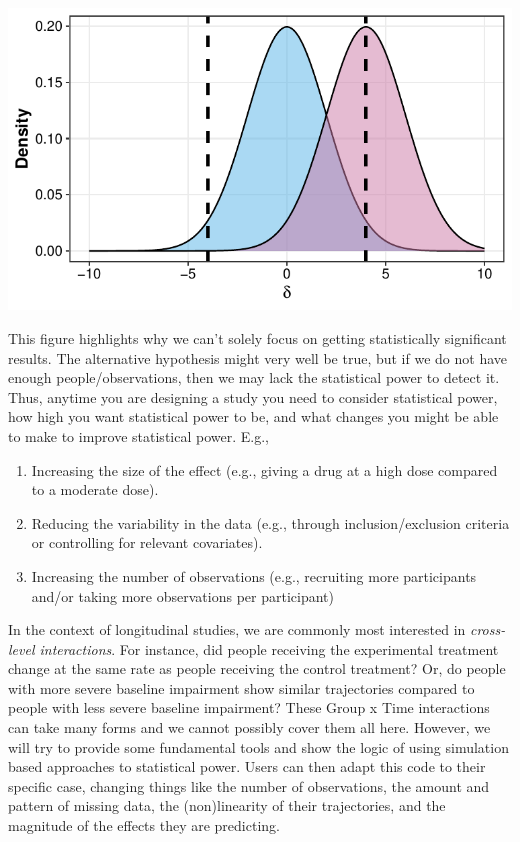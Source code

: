 \documentclass[
]{article}
\providecommand{\tightlist}{%
  \setlength{\itemsep}{0pt}\setlength{\parskip}{0pt}}
\begin{document}
\begin{center}\includegraphics{lohse_ACRM_2023_module_04_files/figure-latex/figure 1-1} \end{center}

This figure highlights why we can't solely focus on getting
statistically significant results. The alternative hypothesis might very
well be true, but if we do not have enough people/observations, then we
may lack the statistical power to detect it. Thus, anytime you are
designing a study you need to consider statistical power, how high you
want statistical power to be, and what changes you might be able to make
to improve statistical power. E.g.,

\begin{enumerate}
\def\labelenumi{\arabic{enumi}.}
\tightlist
\item
  Increasing the size of the effect (e.g., giving a drug at a high dose
  compared to a moderate dose).
\item
  Reducing the variability in the data (e.g., through
  inclusion/exclusion criteria or controlling for relevant covariates).
\item
  Increasing the number of observations (e.g., recruiting more
  participants and/or taking more observations per participant)
\end{enumerate}

In the context of longitudinal studies, we are commonly most interested
in \emph{cross-level interactions}. For instance, did people receiving
the experimental treatment change at the same rate as people receiving
the control treatment? Or, do people with more severe baseline
impairment show similar trajectories compared to people with less severe
baseline impairment? These Group x Time interactions can take many forms
and we cannot possibly cover them all here. However, we will try to
provide some fundamental tools and show the logic of using simulation
based approaches to statistical power. Users can then adapt this code to
their specific case, changing things like the number of observations,
the amount and pattern of missing data, the (non)linearity of their
trajectories, and the magnitude of the effects they are predicting.
\end{document}
